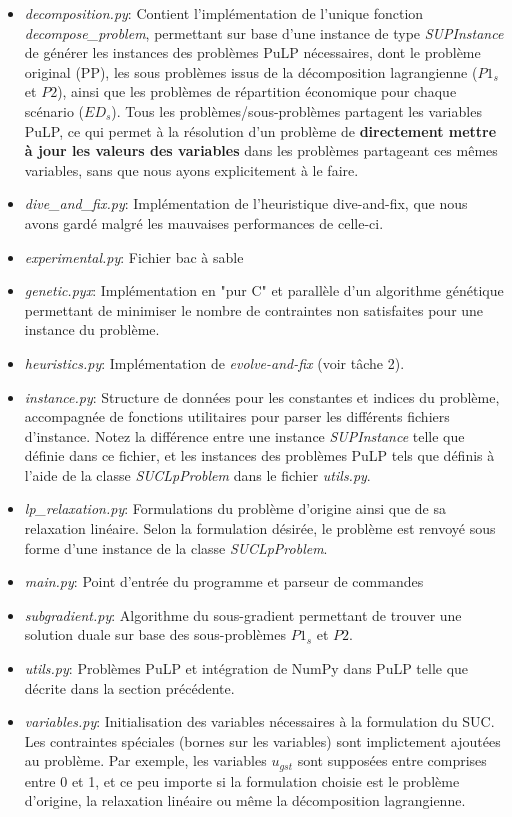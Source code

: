 \begin{itemize}
  \item \textit{decomposition.py}: Contient l'implémentation de l'unique fonction \textit{decompose\_problem}, permettant
  sur base d'une instance de type \textit{SUPInstance} de générer les instances des problèmes PuLP
  nécessaires, dont le problème original (PP), les sous problèmes issus de la décomposition lagrangienne ($P1_s$ et $P2$),
  ainsi que les problèmes de répartition économique pour chaque scénario ($ED_s$). Tous les problèmes/sous-problèmes
  partagent les variables PuLP, ce qui permet à la résolution d'un problème de \textbf{directement mettre à jour les valeurs
  des variables} dans les problèmes partageant ces mêmes variables, sans que nous ayons explicitement à le faire.
  \item \textit{dive\_and\_fix.py}: Implémentation de l'heuristique dive-and-fix, que nous avons gardé malgré les mauvaises
  performances de celle-ci.
  \item \textit{experimental.py}: Fichier bac à sable
  \item \textit{genetic.pyx}: Implémentation en "pur C" et parallèle d'un algorithme génétique permettant de minimiser
  le nombre de contraintes non satisfaites pour une instance du problème.
  \item \textit{heuristics.py}: Implémentation de \textit{evolve-and-fix} (voir tâche 2).
  \item \textit{instance.py}: Structure de données pour les constantes et indices du problème, accompagnée de fonctions
  utilitaires pour parser les différents fichiers d'instance. Notez la différence entre une instance \textit{SUPInstance}
  telle que définie dans ce fichier, et les instances des problèmes PuLP tels que définis à l'aide de la classe
  \textit{SUCLpProblem} dans le fichier \textit{utils.py}.
  \item \textit{lp\_relaxation.py}: Formulations du problème d'origine ainsi que de sa relaxation linéaire. Selon
  la formulation désirée, le problème est renvoyé sous forme d'une instance de la classe \textit{SUCLpProblem}.
  \item \textit{main.py}: Point d'entrée du programme et parseur de commandes
  \item \textit{subgradient.py}: Algorithme du sous-gradient permettant de trouver une solution duale sur base
  des sous-problèmes $P1_s$ et $P2$.
  \item \textit{utils.py}: Problèmes PuLP et intégration de NumPy dans PuLP telle que décrite dans la section précédente.
  \item \textit{variables.py}: Initialisation des variables nécessaires à la formulation du SUC. Les contraintes spéciales
  (bornes sur les variables) sont implictement ajoutées au problème. Par exemple, les variables $u_{gst}$ sont supposées
  entre comprises entre 0 et 1, et ce peu importe si la formulation choisie est le problème d'origine, la relaxation
  linéaire ou même la décomposition lagrangienne.
\end{itemize}